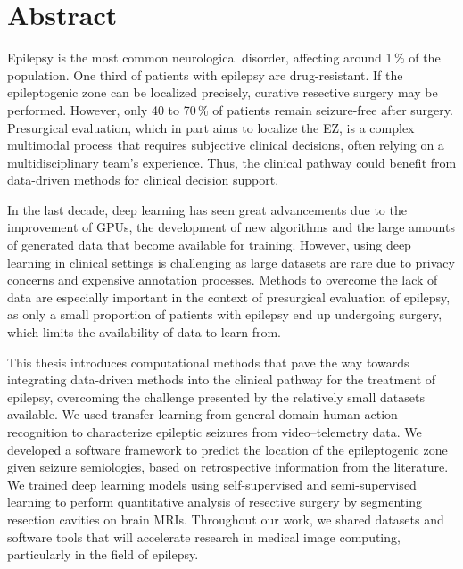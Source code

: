 \chapter{Abstract}


Epilepsy is the most common neurological disorder, affecting around 1\,\% of the population.
One third of patients with epilepsy are drug-resistant.
If the epileptogenic zone can be localized precisely, curative resective surgery may be performed.
However, only 40 to 70\,\% of patients remain seizure-free after surgery.
Presurgical evaluation, which in part aims to localize the \ac{EZ}, is a complex multimodal process that requires subjective clinical decisions, often relying on a multidisciplinary team's experience.
Thus, the clinical pathway could benefit from data-driven methods for clinical decision support.

In the last decade, deep learning has seen great advancements due to the improvement of \acp{GPU}, the development of new algorithms and the large amounts of generated data that become available for training.
However, using deep learning in clinical settings is challenging as large datasets are rare due to privacy concerns and expensive annotation processes.
Methods to overcome the lack of data are especially important in the context of presurgical evaluation of epilepsy, as only a small proportion of patients with epilepsy end up undergoing surgery, which limits the availability of data to learn from.

This thesis introduces computational methods that pave the way towards integrating data-driven methods into the clinical pathway for the treatment of epilepsy, overcoming the challenge presented by the relatively small datasets available.
We used transfer learning from general-domain human action recognition to characterize epileptic seizures from video--telemetry data.
We developed a software framework to predict the location of the epileptogenic zone given seizure semiologies, based on retrospective information from the literature.
We trained deep learning models using self-supervised and semi-supervised learning to perform quantitative analysis of resective surgery by segmenting resection cavities on brain \acp{MRI}.
Throughout our work, we shared datasets and software tools that will accelerate research in medical image computing, particularly in the field of epilepsy.
